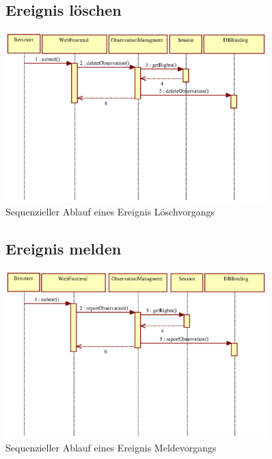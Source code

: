 \documentclass[a4paper,11pt]{scrartcl}
\begin{document}
\begin{figure}[htbp]
\subsection{Ereignis löschen}
		\centering
		\includegraphics[width=0.90\textwidth]{images/seq13_EreignisLoeschen.eps}
		\caption{Sequenzieller Ablauf eines Ereignis Löschvorgangs}
		\label{seq13}
\end{figure}




\begin{figure}[htbp]
\subsection{Ereignis melden}
		\centering
		\includegraphics[width=0.90\textwidth]{images/seq14_EreignisMelden.eps}
		\caption{Sequenzieller Ablauf eines Ereignis Meldevorgangs}
		\label{seq14}
\end{figure}
\end{document}
